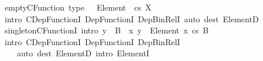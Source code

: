 \begin{isabellebody}
\isamarkupfalse%
\ empty{\isacharunderscore}{\kern0pt}CFunction\ {\isacharbrackleft}{\kern0pt}type{\isacharbrackright}{\kern0pt}{\isacharcolon}{\kern0pt}\ {\isachardoublequoteopen}{\isacharbraceleft}{\kern0pt}{\isacharbraceright}{\kern0pt}\ {\isacharcolon}{\kern0pt}\ Element\ {\isacharbraceleft}{\kern0pt}{\isacharbraceright}{\kern0pt}\ {\isasymrightarrow}cs\ X{\isachardoublequoteclose}\isanewline
%
\isadelimproof
\ \ %
\endisadelimproof
%
\isatagproof
{}\isamarkupfalse%
\ {\isacharparenleft}{\kern0pt}intro\ CDep{\isacharunderscore}{\kern0pt}FunctionI\ Dep{\isacharunderscore}{\kern0pt}FunctionI\ Dep{\isacharunderscore}{\kern0pt}Bin{\isacharunderscore}{\kern0pt}RelI{\isacharparenright}{\kern0pt}\ {\isacharparenleft}{\kern0pt}auto\ dest{\isacharcolon}{\kern0pt}\ ElementD{\isacharparenright}{\kern0pt}%
\endisatagproof
{\isafoldproof}%
%
\isadelimproof
\isanewline
%
\endisadelimproof
\isanewline
{}\isamarkupfalse%
\ singleton{\isacharunderscore}{\kern0pt}CFunctionI\ {\isacharbrackleft}{\kern0pt}intro{\isacharbrackright}{\kern0pt}{\isacharcolon}{\kern0pt}\ {\isachardoublequoteopen}y\ {\isacharcolon}{\kern0pt}\ B\ {\isasymLongrightarrow}\ {\isacharbraceleft}{\kern0pt}{\isasymlangle}x{\isacharcomma}{\kern0pt}\ y{\isasymrangle}{\isacharbraceright}{\kern0pt}\ {\isacharcolon}{\kern0pt}\ Element\ {\isacharbraceleft}{\kern0pt}x{\isacharbraceright}{\kern0pt}\ {\isasymrightarrow}cs\ B{\isachardoublequoteclose}\isanewline
%
\isadelimproof
\ \ %
\endisadelimproof
%
\isatagproof
{}\isamarkupfalse%
\ {\isacharparenleft}{\kern0pt}intro\ CDep{\isacharunderscore}{\kern0pt}FunctionI\ Dep{\isacharunderscore}{\kern0pt}FunctionI\ Dep{\isacharunderscore}{\kern0pt}Bin{\isacharunderscore}{\kern0pt}RelI{\isacharparenright}{\kern0pt}\isanewline
\ \ \ \ {\isacharparenleft}{\kern0pt}auto\ dest{\isacharcolon}{\kern0pt}\ ElementD\ intro{\isacharcolon}{\kern0pt}\ ElementI{\isacharparenright}{\kern0pt}%
\endisatagproof
{\isafoldproof}%
%
\isadelimproof
\isanewline
%
\endisadelimproof
\isanewline
%
\isadelimtheory
\isanewline
%
\endisadelimtheory
%
\isatagtheory
{}\isamarkupfalse%
%
\endisatagtheory
{\isafoldtheory}%
%
\isadelimtheory
%
\endisadelimtheory
%
\end{isabellebody}%
\endinput
